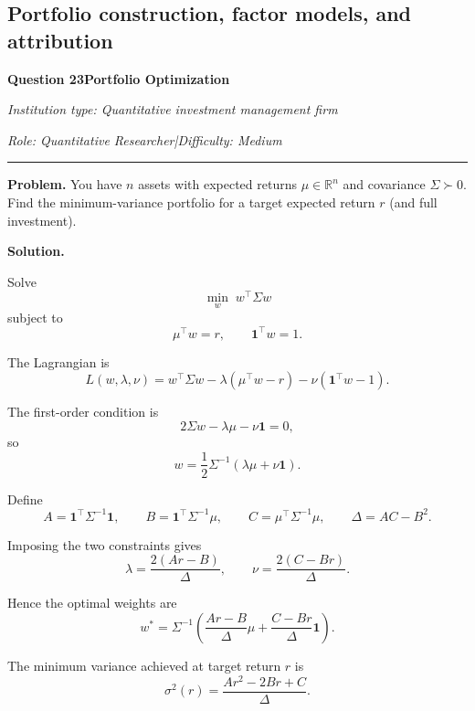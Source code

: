 \documentclass[11pt,letterpaper,openany]{book}
\newcommand{\InterviewQuestionHeader}[5]{%
  \vspace{1.0em}%
  {\large\bfseries #1\enspace #4\par}%
  {\small\itshape Institution type: #2\par}%
  {\small\itshape Role: #3\enspace |\enspace Difficulty: #5\par}%
  \vspace{0.25em}\hrule\vspace{0.45em}%
}
\begin{document}
\subsection{Portfolio construction, factor models, and attribution}

\InterviewQuestionHeader{Question 23}{Quantitative investment management firm}{Quantitative Researcher}{Portfolio Optimization}{Medium}
\textbf{Problem.} You have \(n\) assets with expected returns \(\mu \in \mathbb R^n\) and covariance \(\Sigma \succ 0\). Find the minimum-variance portfolio for a target expected return \(r\) (and full investment).

\textbf{Solution.}

Solve
\[
\min_w \; w^\top \Sigma w
\]
subject to
\[
\mu^\top w = r,
\qquad
\mathbf 1^\top w = 1.
\]

The Lagrangian is
\[
L(w,\lambda,\nu)
=
w^\top \Sigma w
-
\lambda(\mu^\top w-r)
-
\nu(\mathbf 1^\top w-1).
\]

The first-order condition is
\[
2\Sigma w - \lambda \mu - \nu \mathbf 1 = 0,
\]
so
\[
w = \frac12 \Sigma^{-1}(\lambda \mu + \nu \mathbf 1).
\]

Define
\[
A = \mathbf 1^\top \Sigma^{-1}\mathbf 1,
\qquad
B = \mathbf 1^\top \Sigma^{-1}\mu,
\qquad
C = \mu^\top \Sigma^{-1}\mu,
\qquad
\Delta = AC-B^2.
\]

Imposing the two constraints gives
\[
\lambda = \frac{2(Ar-B)}{\Delta},
\qquad
\nu = \frac{2(C-Br)}{\Delta}.
\]

Hence the optimal weights are
\[
w^\ast
=
\Sigma^{-1}
\left(
\frac{Ar-B}{\Delta}\mu
+
\frac{C-Br}{\Delta}\mathbf 1
\right).
\]

The minimum variance achieved at target return \(r\) is
\[
\sigma^2(r)
=
\frac{Ar^2-2Br+C}{\Delta}.
\]
\end{document}
